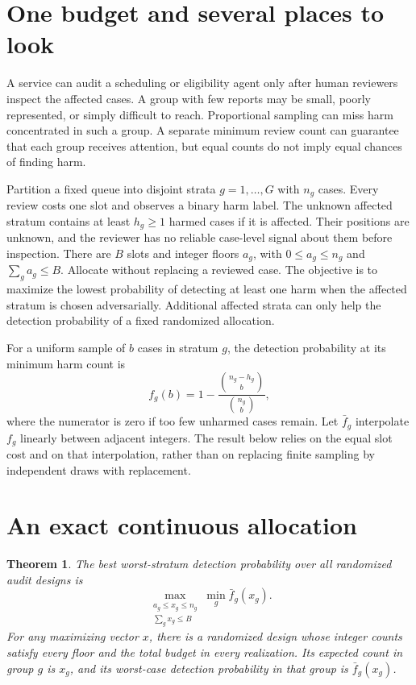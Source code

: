 \documentclass[11pt]{article}
\newtheorem{theorem}{Theorem}
\begin{document}
\section{One budget and several places to look}
A service can audit a scheduling or eligibility agent only after
human reviewers inspect the affected cases. A group with few
reports may be small, poorly represented, or simply difficult to
reach. Proportional sampling can miss harm concentrated in such
a group. A separate minimum review count can guarantee that each
group receives attention, but equal counts do not imply equal
chances of finding harm.

Partition a fixed queue into disjoint strata $g=1,\ldots,G$ with
$n_g$ cases. Every review costs one slot and observes a binary harm
label. The unknown affected stratum contains at least $h_g\ge1$
harmed cases if it is affected. Their positions are unknown, and
the reviewer has no reliable case-level signal about them before
inspection. There are $B$ slots and integer floors $a_g$, with
$0\le a_g\le n_g$ and $\sum_g a_g\le B$. Allocate without replacing
a reviewed case. The objective is to maximize the lowest probability
of detecting at least one harm when the affected stratum is chosen
adversarially. Additional affected strata can only help the detection
probability of a fixed randomized allocation.

For a uniform sample of $b$ cases in stratum $g$, the detection
probability at its minimum harm count is
\[
f_g(b)=1-\frac{\binom{n_g-h_g}{b}}{\binom{n_g}{b}},
\]
where the numerator is zero if too few unharmed cases remain.
Let $\bar f_g$ interpolate $f_g$ linearly between adjacent
integers. The result below relies on the equal slot cost and on
that interpolation, rather than on replacing finite sampling
by independent draws with replacement.

\section{An exact continuous allocation}
\begin{theorem}
The best worst-stratum detection probability over all randomized
audit designs is
\[
\max_{\substack{a_g\le x_g\le n_g\\\sum_g x_g\le B}}
       \min_g\bar f_g(x_g).
\]
For any maximizing vector $x$, there is a randomized design
whose integer counts satisfy every floor and the total budget
in every realization. Its expected count in group $g$ is $x_g$,
and its worst-case detection probability in that group is
$\bar f_g(x_g)$.
\end{theorem}
\end{document}
